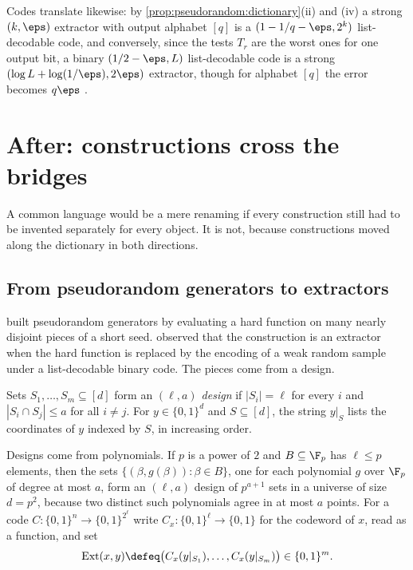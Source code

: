 \begin{refsection}
Codes translate likewise: by \cref{prop:pseudorandom:dictionary}(ii) and (iv) a strong $(k,\eps)$ extractor with output alphabet $[q]$ is a $(1-1/q-\eps,2^k)$ list-decodable code, and conversely, since the tests $T_r$ are the worst ones for one output bit, a binary $(1/2-\eps,L)$ list-decodable code is a strong $(\log L+\log(1/\eps),2\eps)$ extractor, though for alphabet $[q]$ the error becomes $q\eps$ \parencite[Proposition~6.25]{Vadhan2012}.

\section{After: constructions cross the bridges}\label{sec:pseudorandom:after2}

A common language would be a mere renaming if every construction still had to be invented separately for every object. It is not, because constructions moved along the dictionary in both directions.

\subsection{From pseudorandom generators to extractors}\label{sec:pseudorandom:trevisan}

\textcite{NisanWigderson1994} built pseudorandom generators by evaluating a hard function on many nearly disjoint pieces of a short seed. \Textcite{Trevisan2001} observed that the construction is an extractor when the hard function is replaced by the encoding of a weak random sample under a list-decodable binary code. The pieces come from a design.

\begin{definition}[Design]\label{def:pseudorandom:design}
Sets $S_1,\dots,S_m\subseteq[d]$ form an \emph{$(\ell,a)$ design} if $|S_i|=\ell$ for every $i$ and $|S_i\cap S_j|\le a$ for all $i\ne j$. For $y\in\{0,1\}^d$ and $S\subseteq[d]$, the string $y|_S$ lists the coordinates of $y$ indexed by $S$, in increasing order.
\end{definition}

Designs come from polynomials. If $p$ is a power of $2$ and $B\subseteq\F_p$ has $\ell\le p$ elements, then the sets $\{(\beta,g(\beta)):\beta\in B\}$, one for each polynomial $g$ over $\F_p$ of degree at most $a$, form an $(\ell,a)$ design of $p^{a+1}$ sets in a universe of size $d=p^2$, because two distinct such polynomials agree in at most $a$ points. For a code $C\colon\{0,1\}^n\to\{0,1\}^{2^\ell}$ write $C_x\colon\{0,1\}^\ell\to\{0,1\}$ for the codeword of $x$, read as a function, and set
\[
  \pseudorandomExt(x,y)\defeq\bigl(C_x(y|_{S_1}),\dots,C_x(y|_{S_m})\bigr)\in\{0,1\}^m .
\]


\end{refsection}
